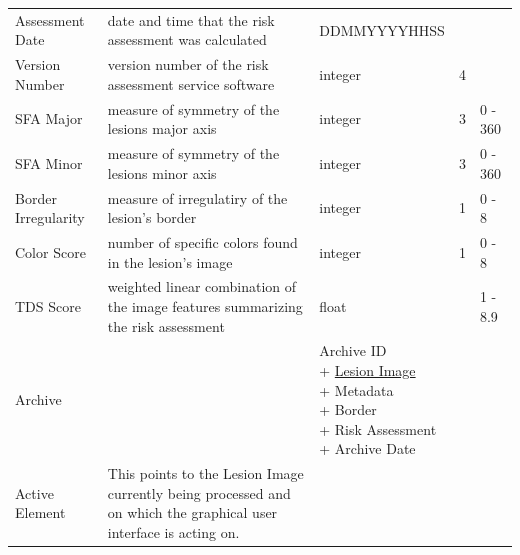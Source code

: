 \begin{longtable}[H]{ | l | p{3.0cm} | p{2.5cm} | p{1.0cm} | p{2.5cm} | }
                    & & \\ \hline

                    Assessment Date & date and time that the risk assessment was calculated &
                    DDMMYYYYHHSS &  &  \\ \hline

                    Version Number & version number of the risk assessment service software &
                    integer & 4 &  \\ \hline

                    SFA Major & measure of symmetry of the lesions major axis &
                    integer & 3 & 0 - 360 \\ \hline

                    SFA Minor & measure of symmetry of the lesions minor axis &
                    integer & 3 & 0 - 360 \\ \hline

                    Border Irregularity & measure of irregulatiry of the lesion's border &
                    integer & 1 & 0 - 8 \\ \hline

                    Color Score & number of specific colors found in the lesion's image &
                    integer & 1 & 0 - 8 \\ \hline

                    \hypertarget{tds_score}{TDS Score} & weighted linear combination of the image features summarizing the risk assessment  &
                    float &  & 1 - 8.9 \\ \hline

                    Archive &  &

                        \specialcell[t]{Archive ID
                            \\ + \hyperlink{lesion_image}{Lesion Image}
                            \\ + Metadata
                            \\ + Border
                            \\ + Risk Assessment
                            \\ + Archive Date
                        }

                     & & \\ \hline

                    Active Element & This points to the Lesion Image currently being processed and on which the graphical user interface is acting on. &


\end{longtable}

